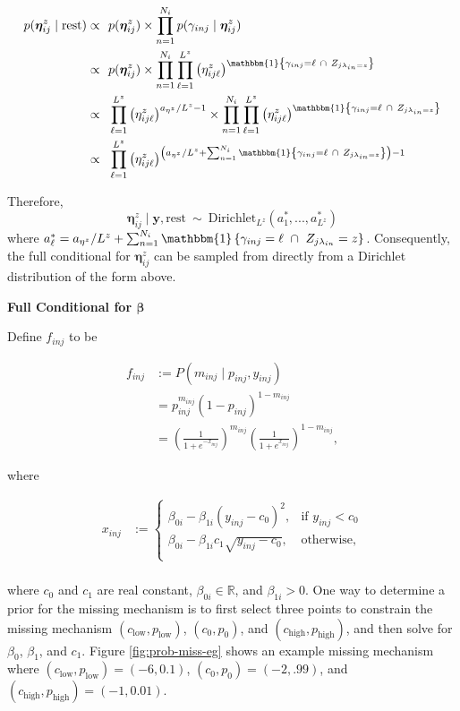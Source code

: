 \documentclass[12pt,]{article}
\newcommand{\p}[1]{\left(#1\right)}
\newcommand{\bc}[1]{ \left\{#1\right\} }
\def\beginmyfig{\begin{figure}[H]\center}
\def\endmyfig{\end{figure}}
\def\Dir{\text{Dirichlet}}
\def\lin{\lambda_{in}}
\def\y{\bm{y}}
\newcommand{\Ind}[1]{\mathbbm{1}\bc{#1}}
\def\rest{\text{rest}}
\def\beginmyfig{\begin{figure}[H]\center}
\def\endmyfig{\end{figure}}
\begin{document}
\begin{align*}
p(\bm \eta^z_{ij} \mid \rest) \propto&~~ p(\bm{\eta}^z_{ij}) \times
  \prod_{n=1}^{N_i} p(\gamma_{inj} \mid \bm \eta^z_{ij})\\
\propto&~~ p(\bm \eta^z_{ij}) \times \prod_{n=1}^{N_i}\prod_{\ell=1}^{L^z}
  \p{\eta^z_{ij\ell}}^{\Ind{ \gamma_{inj}=\ell ~\cap~ Z_{j\lin=z}}}\\
%
\propto&~~ \prod_{\ell=1}^{L^z} \p{\eta^z_{ij\ell}}^{a_{\eta^z}/L^z-1} \times 
\prod_{n=1}^{N_i}\prod_{\ell=1}^{L^z} \p{\eta^z_{ij\ell}}^{\Ind{
\gamma_{inj}=\ell ~\cap~ Z_{j\lin=z}}}\\
\propto&~~ \prod_{\ell=1}^{L^z} \p{\eta^z_{ij\ell}}^{\p{a_{\eta^z} / L^z +
\sum_{n=1}^{N_i} \Ind{ \gamma_{inj}=\ell ~\cap~ Z_{j\lin=z}}} - 1}\\
%
\end{align*}

Therefore, \[
\bm{\eta}^z_{ij} \mid \y,\rest ~\sim~ \Dir_{L^z}\p{a^*_1,...,a^*_{L^z}}
\] where
\(a^*_\ell = a_{\eta^z}/L^z+\sum_{n=1}^{N_i}\Ind{\gamma_{inj}=\ell ~\cap~
Z_{j\lin}=z}\).
Consequently, the full conditional for \(\bm{\eta}^z_{ij}\) can be
sampled from directly from a Dirichlet distribution of the form above.
\vspace{2em}


\textbf{Full Conditional for $\bm\beta$}

Define \(f_{inj}\) to be

\begin{align*}
f_{inj} &:= P(m_{inj} \mid p_{inj}, y_{inj}) \\
&= p_{inj}^{m_{inj}} (1-p_{inj})^{1 - m_{inj}} \\
&= \left(\frac{1}{1+e^{-x_{inj}}}
\right)^{m_{inj}}\left(\frac{1}{1+e^{x_{inj}}} \right)^{1-m_{inj}},
\end{align*}

where

\begin{align*}
  x_{inj} &:= \begin{cases}
  \beta_{0i} - \beta_{1i}(y_{inj}-c_0)^2, & \text{if } y_{inj} < c_0\nonumber \\
  \beta_{0i} - \beta_{1i}c_1\sqrt{y_{inj}-c_0}, & \text{otherwise}, \nonumber \\
  \end{cases}\\
\end{align*}

where \(c_0\) and \(c_1\) are real constant, $\beta_{0i} \in \mathbb{R}$, and
$\beta_{1i} > 0$.
One way to determine a prior for the missing mechanism is to first select three
points to constrain the missing mechanism $(c_\text{low}, p_\text{low})$,
$(c_0, p_0)$, and $(c_\text{high}, p_\text{high})$, and then 
solve for $\beta_0$, $\beta_1$, and $c_1$. Figure \ref{fig:prob-miss-eg} shows
an example missing mechanism where $(c_\text{low}, p_\text{low}) = (-6,0.1)$,
$(c_0, p_0)=(-2,.99)$, and $(c_\text{high}, p_\text{high}) = (-1,0.01)$.
\end{document}
